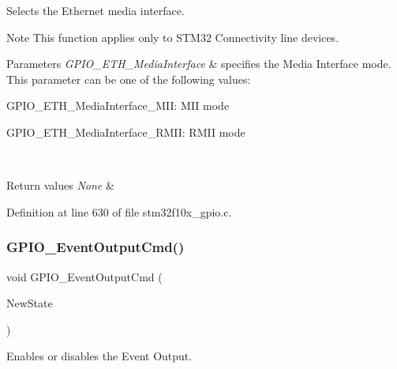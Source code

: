 Selects the Ethernet media interface. 

\begin{DoxyNote}{Note}
This function applies only to S\+T\+M32 Connectivity line devices. 
\end{DoxyNote}

\begin{DoxyParams}{Parameters}
{\em G\+P\+I\+O\+\_\+\+E\+T\+H\+\_\+\+Media\+Interface} & specifies the Media Interface mode. This parameter can be one of the following values\+: \begin{DoxyItemize}
\item G\+P\+I\+O\+\_\+\+E\+T\+H\+\_\+\+Media\+Interface\+\_\+\+M\+II\+: M\+II mode \item G\+P\+I\+O\+\_\+\+E\+T\+H\+\_\+\+Media\+Interface\+\_\+\+R\+M\+II\+: R\+M\+II mode \end{DoxyItemize}
\\
\hline
\end{DoxyParams}

\begin{DoxyRetVals}{Return values}
{\em None} & \\
\hline
\end{DoxyRetVals}


Definition at line 630 of file stm32f10x\+\_\+gpio.\+c.

\mbox{\label{group___g_p_i_o___private___functions_gaf13ab3d59e467df44b492f1cdfe2f588}} 
\subsubsection{\texorpdfstring{G\+P\+I\+O\+\_\+\+Event\+Output\+Cmd()}{GPIO\_EventOutputCmd()}}
{\footnotesize\ttfamily void G\+P\+I\+O\+\_\+\+Event\+Output\+Cmd (\begin{DoxyParamCaption}\item[{\hyperlink{group___exported__types_gac9a7e9a35d2513ec15c3b537aaa4fba1}{Functional\+State}}]{New\+State }\end{DoxyParamCaption})}



Enables or disables the Event Output. 


